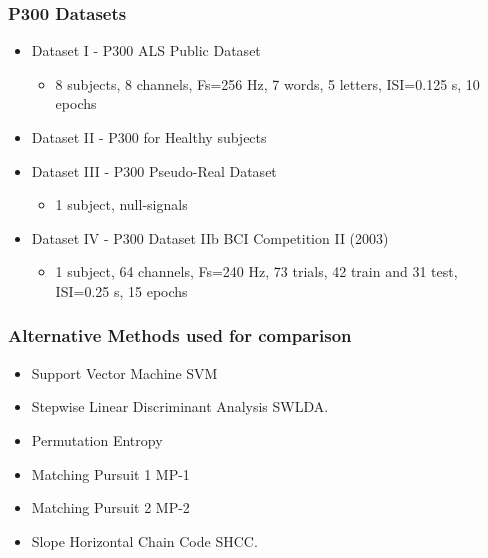 \documentclass[aspectratio=169]{beamer}
\newcommand\Fontre{\fontsize{16}{16.2}\selectfont}
\begin{document}
\begin{frame}
\frametitle{P300 Datasets}
\begin{center}
\begin{itemize}
 \item<1-> \Fontre Dataset I - P300 ALS Public Dataset 
 \begin{itemize}
 \item 8 subjects, 8 channels, Fs=256 Hz, 7 words, 5 letters, ISI=0.125 s, 10 epochs
 \end{itemize}
 \item<2-> \Fontre Dataset II - P300 for Healthy subjects
 \item<3-> \Fontre Dataset III - P300 Pseudo-Real Dataset 
 \begin{itemize}
 \item 1 subject, null-signals
 \end{itemize}
 \item<4-> \Fontre Dataset IV - P300 Dataset IIb BCI Competition II (2003) 
 \begin{itemize}
 \item 1 subject, 64 channels, Fs=240 Hz, 73 trials, 42 train and 31 test, ISI=0.25 s, 15 epochs
 \end{itemize}
\end{itemize}
\end{center}
\end{frame} 

\begin{frame}
\frametitle{Alternative Methods used for comparison}
\begin{center}
\begin{itemize}
 \item<1-> \Fontre Support Vector Machine SVM
 \item<2-> \Fontre Stepwise Linear Discriminant Analysis SWLDA.
 \item<3-> \Fontre Permutation Entropy %
 \item<4-> \Fontre Matching Pursuit 1 MP-1 %
 \item<5-> \Fontre Matching Pursuit 2 MP-2
 \item<6-> \Fontre Slope Horizontal Chain Code SHCC.
\end{itemize}
\end{center}
\end{frame} 
\end{document}
